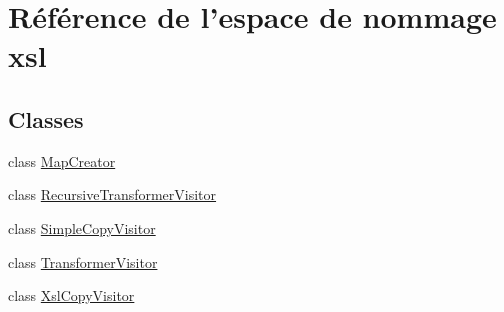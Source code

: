 \hypertarget{namespacexsl}{
\section{Référence de l'espace de nommage xsl}
\label{namespacexsl}
}
\subsection*{Classes}
\begin{DoxyCompactItemize}
\item 
class \hyperlink{classxsl_1_1_map_creator}{MapCreator}
\item 
class \hyperlink{classxsl_1_1_recursive_transformer_visitor}{RecursiveTransformerVisitor}
\item 
class \hyperlink{classxsl_1_1_simple_copy_visitor}{SimpleCopyVisitor}
\item 
class \hyperlink{classxsl_1_1_transformer_visitor}{TransformerVisitor}
\item 
class \hyperlink{classxsl_1_1_xsl_copy_visitor}{XslCopyVisitor}
\end{DoxyCompactItemize}
